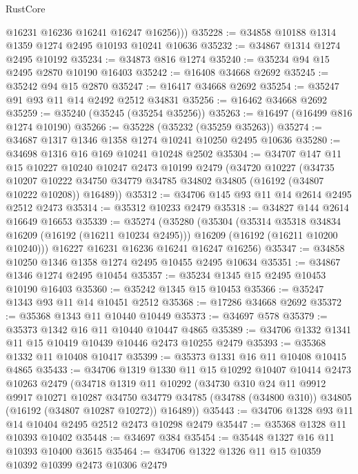 \begin{lexlean}{RustCore}
\begin{coremodule}
          @16231
          @16236
          @16241
          @16247
          @16256)))
@35228 := @34858 @10188 @1314 @1359 @1274 @2495 @10193 @10241 @10636
@35232 := @34867 @1314 @1274 @2495 @10192
@35234 := @34873 @816 @1274
@35240 := @35234 @94 @15 @2495 @2870 @10190 @16403
@35242 := @16408 @34668 @2692
@35245 := @35242 @94 @15 @2870
@35247 := @16417 @34668 @2692
@35254 := @35247 @91 @93 @11 @14 @2492 @2512 @34831
@35256 := @16462 @34668 @2692
@35259 := @35240 (@35245 (@35254 @35256))
@35263 := @16497 (@16499 @816 @1274 @10190)
@35266 := @35228 (@35232 (@35259 @35263))
@35274 := @34687 @1317 @1346 @1358 @1274 @10241 @10250 @2495 @10636
@35280 := @34698 @1316 @16 @169 @10241 @10248 @2502
@35304 := @34707
    @147
    @11
    @15
    @10227
    @10240
    @10247
    @2473
    @10199
    @2479
    (@34720
      @10227
      (@34735
        @10207
        @10222
        @34750
        @34779
        @34785
        @34802
        @34805
        (@16192 (@34807 @10222 @10208))
        @16489))
@35312 := @34706 @145 @93 @11 @14 @2614 @2495 @2512 @2473
@35314 := @35312 @10233 @2479
@35318 := @34827 @144 @2614 @16649 @16653
@35339 := @35274
    (@35280
      (@35304
        (@35314 @35318 @34834 @16209 (@16192 (@16211 @10234 @2495)))
        @16209
        (@16192 (@16211 @10200 @10240)))
      @16227
      @16231
      @16236
      @16241
      @16247
      @16256)
@35347 := @34858 @10250 @1346 @1358 @1274 @2495 @10455 @2495 @10634
@35351 := @34867 @1346 @1274 @2495 @10454
@35357 := @35234 @1345 @15 @2495 @10453 @10190 @16403
@35360 := @35242 @1345 @15 @10453
@35366 := @35247 @1343 @93 @11 @14 @10451 @2512
@35368 := @17286 @34668 @2692
@35372 := @35368 @1343 @11 @10440 @10449
@35373 := @34697 @578
@35379 := @35373 @1342 @16 @11 @10440 @10447 @4865
@35389 := @34706 @1332 @1341 @11 @15 @10419 @10439 @10446 @2473 @10255 @2479
@35393 := @35368 @1332 @11 @10408 @10417
@35399 := @35373 @1331 @16 @11 @10408 @10415 @4865
@35433 := @34706
    @1319
    @1330
    @11
    @15
    @10292
    @10407
    @10414
    @2473
    @10263
    @2479
    (@34718
      @1319
      @11
      @10292
      (@34730
        @310
        @24
        @11
        @9912
        @9917
        @10271
        @10287
        @34750
        @34779
        @34785
        (@34788 (@34800 @310))
        @34805
        (@16192 (@34807 @10287 @10272))
        @16489))
@35443 := @34706 @1328 @93 @11 @14 @10404 @2495 @2512 @2473 @10298 @2479
@35447 := @35368 @1328 @11 @10393 @10402
@35448 := @34697 @384
@35454 := @35448 @1327 @16 @11 @10393 @10400 @3615
@35464 := @34706 @1322 @1326 @11 @15 @10359 @10392 @10399 @2473 @10306 @2479

\end{coremodule}
\end{lexlean}
